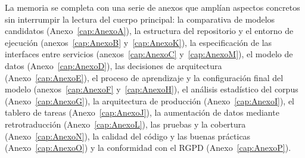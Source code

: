 La memoria se completa con una serie de anexos que amplían aspectos concretos sin interrumpir la lectura del cuerpo principal: la comparativa de modelos candidatos (Anexo~\ref{cap:AnexoA}), la estructura del repositorio y el entorno de ejecución (anexos~\ref{cap:AnexoB} y~\ref{cap:AnexoK}), la especificación de las interfaces entre servicios (anexos~\ref{cap:AnexoC} y~\ref{cap:AnexoM}), el modelo de datos (Anexo~\ref{cap:AnexoD}), las decisiones de arquitectura (Anexo~\ref{cap:AnexoE}), el proceso de aprendizaje y la configuración final del modelo (anexos~\ref{cap:AnexoF} y~\ref{cap:AnexoH}), el análisis estadístico del corpus (Anexo~\ref{cap:AnexoG}), la arquitectura de producción (Anexo~\ref{cap:AnexoI}), el tablero de tareas (Anexo~\ref{cap:AnexoJ}), la aumentación de datos mediante retrotraducción (Anexo~\ref{cap:AnexoL}), las pruebas y la cobertura (Anexo~\ref{cap:AnexoN}), la calidad del código y las buenas prácticas (Anexo~\ref{cap:AnexoO}) y la conformidad con el RGPD (Anexo~\ref{cap:AnexoP}).
